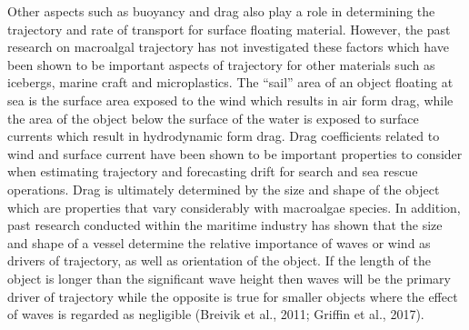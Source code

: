 \documentclass[
]{article}
\begin{document}
Other aspects such as buoyancy and drag also play a role in determining
the trajectory and rate of transport for surface floating material.
However, the past research on macroalgal trajectory has not investigated
these factors which have been shown to be important aspects of
trajectory for other materials such as icebergs, marine craft and
microplastics. The ``sail'' area of an object floating at sea is the
surface area exposed to the wind which results in air form drag, while
the area of the object below the surface of the water is exposed to
surface currents which result in hydrodynamic form drag. Drag
coefficients related to wind and surface current have been shown to be
important properties to consider when estimating trajectory and
forecasting drift for search and sea rescue operations. Drag is
ultimately determined by the size and shape of the object which are
properties that vary considerably with macroalgae species. In addition,
past research conducted within the maritime industry has shown that the
size and shape of a vessel determine the relative importance of waves or
wind as drivers of trajectory, as well as orientation of the object. If
the length of the object is longer than the significant wave height then
waves will be the primary driver of trajectory while the opposite is
true for smaller objects where the effect of waves is regarded as
negligible (Breivik et al., 2011; Griffin et al., 2017).
\end{document}
